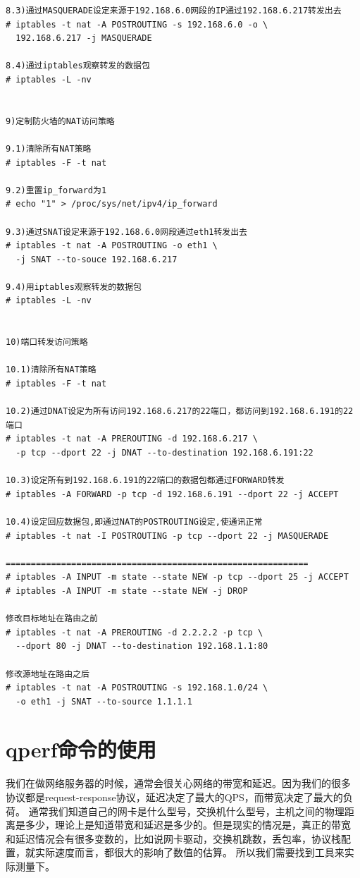 \begin{verbatim}
8.3)通过MASQUERADE设定来源于192.168.6.0网段的IP通过192.168.6.217转发出去
# iptables -t nat -A POSTROUTING -s 192.168.6.0 -o \
  192.168.6.217 -j MASQUERADE

8.4)通过iptables观察转发的数据包
# iptables -L -nv


9)定制防火墙的NAT访问策略

9.1)清除所有NAT策略
# iptables -F -t nat

9.2)重置ip_forward为1
# echo "1" > /proc/sys/net/ipv4/ip_forward

9.3)通过SNAT设定来源于192.168.6.0网段通过eth1转发出去
# iptables -t nat -A POSTROUTING -o eth1 \
  -j SNAT --to-souce 192.168.6.217

9.4)用iptables观察转发的数据包
# iptables -L -nv


10)端口转发访问策略

10.1)清除所有NAT策略
# iptables -F -t nat

10.2)通过DNAT设定为所有访问192.168.6.217的22端口，都访问到192.168.6.191的22端口
# iptables -t nat -A PREROUTING -d 192.168.6.217 \
  -p tcp --dport 22 -j DNAT --to-destination 192.168.6.191:22

10.3)设定所有到192.168.6.191的22端口的数据包都通过FORWARD转发
# iptables -A FORWARD -p tcp -d 192.168.6.191 --dport 22 -j ACCEPT

10.4)设定回应数据包,即通过NAT的POSTROUTING设定,使通讯正常
# iptables -t nat -I POSTROUTING -p tcp --dport 22 -j MASQUERADE

============================================================
# iptables -A INPUT -m state --state NEW -p tcp --dport 25 -j ACCEPT
# iptables -A INPUT -m state --state NEW -j DROP

修改目标地址在路由之前
# iptables -t nat -A PREROUTING -d 2.2.2.2 -p tcp \
  --dport 80 -j DNAT --to-destination 192.168.1.1:80

修改源地址在路由之后
# iptables -t nat -A POSTROUTING -s 192.168.1.0/24 \
  -o eth1 -j SNAT --to-source 1.1.1.1
\end{verbatim}

\section{qperf命令的使用}
\label{sec:qperfCmd}

我们在做网络服务器的时候，通常会很关心网络的带宽和延迟。因为我们的很多
协议都是request-response协议，延迟决定了最大的QPS，而带宽决定了最大的负
荷。 通常我们知道自己的网卡是什么型号，交换机什么型号，主机之间的物理距
离是多少，理论上是知道带宽和延迟是多少的。但是现实的情况是，真正的带宽
和延迟情况会有很多变数的，比如说网卡驱动，交换机跳数，丢包率，协议栈配
置，就实际速度而言，都很大的影响了数值的估算。 所以我们需要找到工具来实
际测量下。

